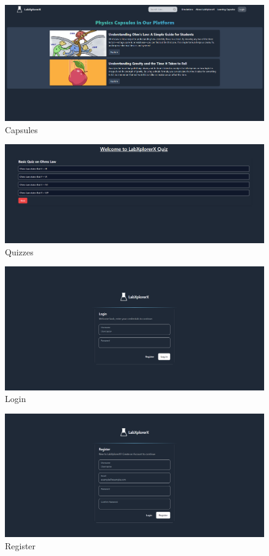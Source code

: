  \begin{figure}[H]
    \centering
     \includegraphics[width = 16cm]{Diagrams/output/capsules.png}
     \caption{Capsules}
 \end{figure}

 \begin{figure}[H]
    \centering
     \includegraphics[width = 16cm]{Diagrams/output/quiz.png}
     \caption{Quizzes}
 \end{figure}

 \begin{figure}[H]
    \centering
     \includegraphics[width = 16cm]{Diagrams/output/login.png}
     \caption{Login}
 \end{figure}

 \begin{figure}[H]
    \centering
     \includegraphics[width = 16cm]{Diagrams/output//register.png}
     \caption{Register}
 \end{figure}

